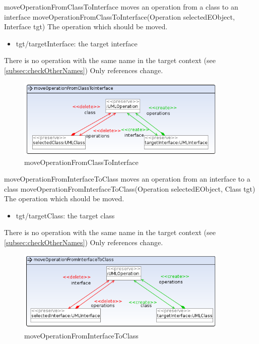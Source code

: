 \op
{moveOperationFromClassToInterface}
{moves an operation from a class to an interface}
{moveOperationFromClassToInterface(Operation selectedEObject, Interface tgt)}
{The operation which should be moved.}
{
\begin{itemize}
 \item tgt/targetInterface: the target interface
\end{itemize}
}
{There is no operation with the same name in the target context (see
\ref{subsec:checkOtherNames})}
{Only references change.}
\begin{figure}[H]
  \centering
  \includegraphics[width=0.9\textwidth]{pics/moveOperationFromClassToInterface.png}
  \caption{moveOperationFromClassToInterface}
  \label{moveOperationFromClassToInterface}
\end{figure}
\op
{moveOperationFromInterfaceToClass}
{moves an operation from an interface to a class}
{moveOperationFromInterfaceToClass(Operation selectedEObject, Class tgt)}
{The operation which should be moved.}
{
\begin{itemize}
 \item tgt/targetClass: the target class
\end{itemize}
}
{There is no operation with the same name in the target context (see
\ref{subsec:checkOtherNames})}
{Only references change.}
\begin{figure}[H]
  \centering
  \includegraphics[width=0.9\textwidth]{pics/moveOperationFromInterfaceToClass.png}
  \caption{moveOperationFromInterfaceToClass}
  \label{moveOperationFromInterfaceToClass}
\end{figure}